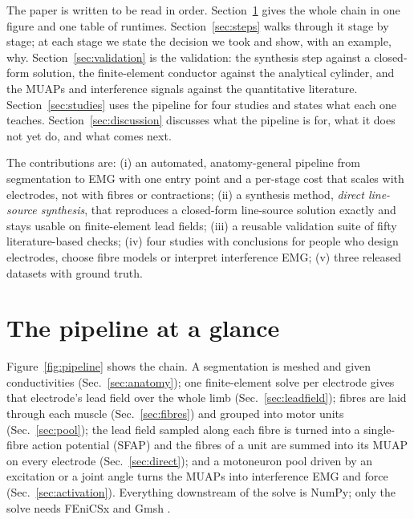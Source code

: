 \documentclass[11pt,a4paper]{article}
\begin{document}
The paper is written to be read in order. Section~\ref{sec:overview} gives the whole
chain in one figure and one table of runtimes. Section~\ref{sec:steps} walks through it
stage by stage; at each stage we state the decision we took and show, with an example, why.
Section~\ref{sec:validation} is the validation: the synthesis step against a closed-form
solution, the finite-element conductor against the analytical cylinder, and the MUAPs and
interference signals against the quantitative literature. Section~\ref{sec:studies} uses
the pipeline for four studies and states what each one teaches. Section~\ref{sec:discussion}
discusses what the pipeline is for, what it does not yet do, and what comes next.

The contributions are: (i) an automated, anatomy-general pipeline from segmentation to
EMG with one entry point and a per-stage cost that scales with electrodes, not with
fibres or contractions; (ii) a synthesis method, \emph{direct line-source synthesis},
that reproduces a closed-form line-source solution exactly and stays usable on
finite-element lead fields; (iii) a reusable validation suite of fifty literature-based
checks; (iv) four studies with conclusions for people who design electrodes, choose fibre
models or interpret interference EMG; (v) three released datasets with ground truth.

\section{The pipeline at a glance}
\label{sec:overview}

Figure~\ref{fig:pipeline} shows the chain. A segmentation is meshed and given
conductivities (Sec.~\ref{sec:anatomy}); one finite-element solve per electrode gives that
electrode's lead field over the whole limb (Sec.~\ref{sec:leadfield}); fibres are laid
through each muscle (Sec.~\ref{sec:fibres}) and grouped into motor units
(Sec.~\ref{sec:pool}); the lead field sampled along each fibre is turned into a
single-fibre action potential (SFAP) and the fibres of a unit are summed into its MUAP on
every electrode (Sec.~\ref{sec:direct}); and a motoneuron pool driven by an excitation or
a joint angle turns the MUAPs into interference EMG and force
(Sec.~\ref{sec:activation}). Everything downstream of the solve is NumPy; only the solve
needs FEniCSx \citep{baratta2023dolfinx} and Gmsh \citep{geuzaine2009gmsh}.
\end{document}
